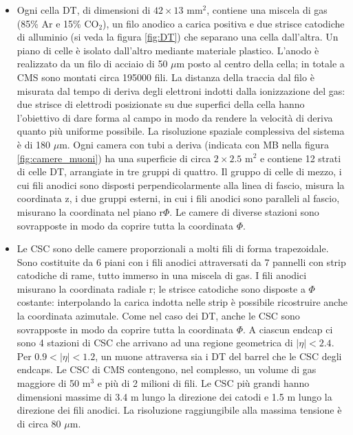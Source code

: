 \begin{itemize}
\item Ogni cella DT, di dimensioni di $42 \times 13 \mbox{ mm}^2$, contiene una miscela di gas (85\% Ar e 15\% $\mbox{CO}_2$), un filo anodico a carica positiva e due strisce catodiche di alluminio (si veda la figura \ref{fig:DT}) che separano una cella dall'altra. Un piano di celle \`e isolato dall'altro mediante materiale plastico. L'anodo \`e realizzato da un filo di acciaio di 50 $\mu$m posto al centro della cella; in totale a CMS sono montati circa 195000 fili. La distanza della traccia dal filo \`e misurata dal tempo di deriva degli elettroni indotti dalla ionizzazione del gas: due strisce di elettrodi posizionate su due superfici della cella hanno l'obiettivo di dare forma al campo in modo da rendere la velocit\`a di deriva quanto pi\`u uniforme possibile. La risoluzione spaziale complessiva del sistema \`e di 180 $\mu$m. Ogni camera con tubi a deriva (indicata con MB nella figura \ref{fig:camere_muoni}) ha una superficie di circa $2 \times 2.5 \mbox{ m}^2$ e contiene 12 strati di celle DT, arrangiate in tre gruppi di quattro. Il gruppo di celle di mezzo, i cui fili anodici sono disposti perpendicolarmente alla linea di fascio, misura la coordinata $\mathrm{z}$, i due gruppi esterni, in cui i fili anodici sono paralleli al fascio, misurano la coordinata nel piano $\mathrm{r}\Phi$. Le camere di diverse stazioni sono sovrapposte in modo da coprire tutta la coordinata $\Phi$.\\
\item Le CSC sono delle camere proporzionali a molti fili di forma trapezoidale. Sono costituite da 6 piani con i fili anodici attraversati da 7 pannelli con strip catodiche di rame, tutto immerso in una miscela di gas. I fili anodici misurano la coordinata radiale $\mathrm{r}$; le strisce catodiche sono disposte a $\Phi$ costante: interpolando la carica indotta nelle strip \`e possibile ricostruire anche la coordinata azimutale. Come nel caso dei DT, anche le CSC sono sovrapposte in modo da coprire tutta la coordinata $\Phi$. A ciascun endcap ci sono 4 stazioni di CSC che arrivano ad una regione geometrica di $|\eta|<2.4$. Per $0.9<|\eta|<1.2$, un muone attraversa sia i DT del barrel che le CSC degli endcaps. Le CSC di CMS contengono, nel complesso, un volume di gas maggiore di 50 $\mbox{m}^3$ e pi\`u di 2 milioni di fili. Le CSC pi\`u grandi hanno dimensioni massime di 3.4 m lungo la direzione dei catodi e 1.5 m lungo la direzione dei fili anodici. La risoluzione raggiungibile alla massima tensione \`e di circa 80 $\mu$m.\\

\end{itemize}
